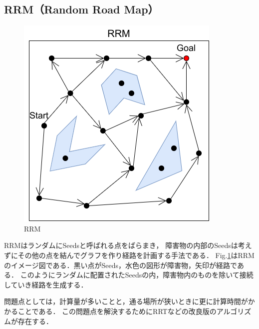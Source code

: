 
\subsection{RRM（Random Road Map）}

\begin{figure}[hbtp]
  \centering
 \includegraphics[keepaspectratio, scale=0.8]
      {images/png/RRT.drawio.png}
 \caption{RRM}
 \label{Fig:RRM}
\end{figure}

RRMはランダムにSeedsと呼ばれる点をばらまき，
障害物の内部のSeedsは考えずにその他の点を結んでグラフを作り経路を計画する手法である．
Fig.\ref{Fig:RRM}はRRMのイメージ図である．黒い点がSeeds，水色の図形が障害物，矢印が経路である．
このようにランダムに配置されたSeedsの内，障害物内のものを除いて接続していき経路を生成する．

問題点としては，計算量が多いことと，通る場所が狭いときに更に計算時間がかかることである．
この問題点を解決するためにRRTなどの改良版のアルゴリズムが存在する．

\newpage
